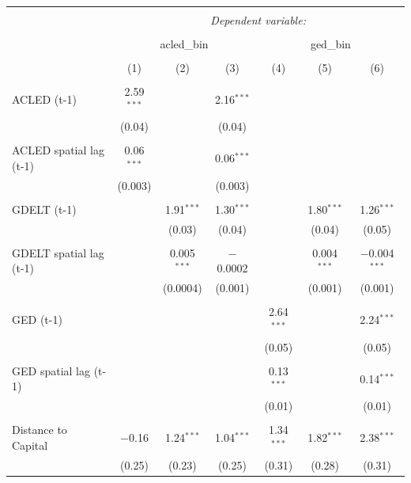 \documentclass[hidelinks]{article}
\begin{document}
\newpage
\begin{table}[!htbp] \centering 
  \caption{} 
  \label{} 
\begin{tabular}{@{\extracolsep{5pt}}lcccccc} 
\\[-1.8ex]\hline 
\hline \\[-1.8ex] 
 & \multicolumn{6}{c}{\textit{Dependent variable:}} \\ 
\cline{2-7} 
\\[-1.8ex] & \multicolumn{3}{c}{acled\_bin} & \multicolumn{3}{c}{ged\_bin} \\ 
\\[-1.8ex] & (1) & (2) & (3) & (4) & (5) & (6)\\ 
\hline \\[-1.8ex] 
ACLED (t-1) & 2.59$^{***}$ &  & 2.16$^{***}$ &  &  &  \\ 
  & (0.04) &  & (0.04) &  &  &  \\ 
  & & & & & & \\ 
ACLED spatial lag (t-1) & 0.06$^{***}$ &  & 0.06$^{***}$ &  &  &  \\ 
  & (0.003) &  & (0.003) &  &  &  \\ 
  & & & & & & \\ 
GDELT (t-1) &  & 1.91$^{***}$ & 1.30$^{***}$ &  & 1.80$^{***}$ & 1.26$^{***}$ \\ 
  &  & (0.03) & (0.04) &  & (0.04) & (0.05) \\ 
  & & & & & & \\ 
GDELT spatial lag (t-1) &  & 0.005$^{***}$ & $-$0.0002 &  & 0.004$^{***}$ & $-$0.004$^{***}$ \\ 
  &  & (0.0004) & (0.001) &  & (0.001) & (0.001) \\ 
  & & & & & & \\ 
GED (t-1) &  &  &  & 2.64$^{***}$ &  & 2.24$^{***}$ \\ 
  &  &  &  & (0.05) &  & (0.05) \\ 
  & & & & & & \\ 
GED spatial lag (t-1) &  &  &  & 0.13$^{***}$ &  & 0.14$^{***}$ \\ 
  &  &  &  & (0.01) &  & (0.01) \\ 
  & & & & & & \\ 
Distance to Capital & $-$0.16 & 1.24$^{***}$ & 1.04$^{***}$ & 1.34$^{***}$ & 1.82$^{***}$ & 2.38$^{***}$ \\ 
  & (0.25) & (0.23) & (0.25) & (0.31) & (0.28) & (0.31) \\ 

\end{tabular}
\end{table}
\end{document}
